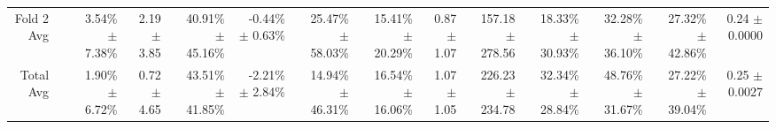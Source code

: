 \begin{table}[H]
{\begin{tabular}{rrrrrrrrrrrrrr}
Fold 2 Avg &  & \shortstack{3.54\% \\ $\pm$ 7.38\%} & \shortstack{2.19 \\ $\pm$ 3.85} & \shortstack{40.91\% \\ $\pm$ 45.16\%} & \shortstack{-0.44\% \\ $\pm$ 0.63\%} & \shortstack{25.47\% \\ $\pm$ 58.03\%} & \shortstack{15.41\% \\ $\pm$ 20.29\%} & \shortstack{0.87 \\ $\pm$ 1.07} & \shortstack{157.18 \\ $\pm$ 278.56} & \shortstack{18.33\% \\ $\pm$ 30.93\%} & \shortstack{32.28\% \\ $\pm$ 36.10\%} & \shortstack{27.32\% \\ $\pm$ 42.86\%} & \shortstack{0.24 \\ $\pm$ 0.0000} \\
Total Avg &  & \shortstack{1.90\% \\ $\pm$ 6.72\%} & \shortstack{0.72 \\ $\pm$ 4.65} & \shortstack{43.51\% \\ $\pm$ 41.85\%} & \shortstack{-2.21\% \\ $\pm$ 2.84\%} & \shortstack{14.94\% \\ $\pm$ 46.31\%} & \shortstack{16.54\% \\ $\pm$ 16.06\%} & \shortstack{1.07 \\ $\pm$ 1.05} & \shortstack{226.23 \\ $\pm$ 234.78} & \shortstack{32.34\% \\ $\pm$ 28.84\%} & \shortstack{48.76\% \\ $\pm$ 31.67\%} & \shortstack{27.22\% \\ $\pm$ 39.04\%} & \shortstack{0.25 \\ $\pm$ 0.0027} \\
\bottomrule
\end{tabular}}
\end{table}
